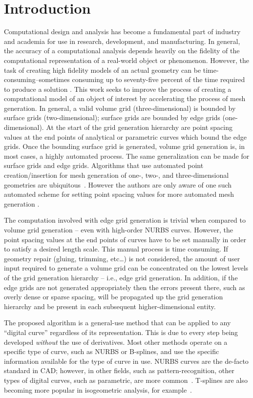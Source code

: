 \section{Introduction}
Computational design and analysis has become a fundamental part of 
industry and academia for use in research, development, and manufacturing. 
In general, the accuracy of a computational analysis depends heavily on 
the fidelity of the computational representation of a real-world object or 
phenomenon.  However, the task of creating high fidelity models of an 
actual geometry can be time-consuming--sometimes consuming up to 
seventy-five percent of the time required to produce a solution 
\cite{bischoff05}. This work seeks to improve the process of creating a 
computational model of an object of interest by accelerating the process 
of mesh generation. In general, a valid volume grid (three-dimensional) is 
bounded by surface grids (two-dimensional); surface grids are bounded by edge grids (one-dimensional). At the start of the grid generation hierarchy are point spacing values at the end points of analytical or parametric curves which bound the edge grids. Once the bounding surface grid is generated, volume grid generation is, in most cases, a highly automated process. The same generalization can be made for surface grids and edge grids. 
Algorithms that use automated point creation/insertion for mesh generation of one-, two-, and three-dimensional geometries are ubiquitous~\cite{cubit,delaunay,aflr}. However the authors are only aware of one such automated scheme for setting point spacing values for more automated mesh generation \cite{mclaurin12}.

The computation involved with edge grid generation is trivial when 
compared to volume grid generation -- even with high-order NURBS curves.  
However, the point spacing values at the end points of curves have to be 
set manually in order to satisfy a desired length scale. This manual 
process is time consuming. If geometry repair (gluing, trimming, etc…) is 
not considered, the amount of user input required to generate a volume 
grid can be concentrated on the lowest levels of the grid generation 
hierarchy -- i.e., edge grid generation.  In addition, if the edge grids 
are not generated appropriately then the errors present there, such as 
overly dense or sparse spacing, will be propagated up the grid generation hierarchy and be present in each subsequent higher-dimensional entity.

The proposed algorithm is a general-use method that can be applied to any ``digital curve'' regardless of its 
representation. This is due to every step being developed {\it without} the use of derivatives. Most other methods 
operate on a specific type of curve, such as NURBS or B-splines, and use the specific information available for 
the type of curve in use.  NURBS curves are the de-facto standard in CAD; however, in other fields, such as 
pattern-recognition, other types of digital curves, such as parametric, are more 
common~\cite{interactive_curve_modeling}.  T-splines are also becoming more popular in isogeometric 
analysis, for example~\cite{iga}. 

